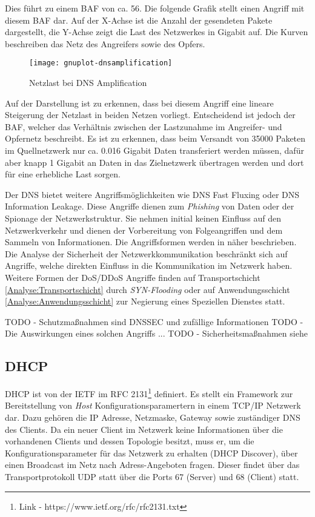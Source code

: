 \clearpage

Dies führt zu einem \ac{BAF} von ca. 56. Die folgende Grafik stellt einen Angriff mit diesem \ac{BAF} dar. Auf der X-Achse ist die Anzahl der gesendeten Pakete dargestellt, die Y-Achse zeigt die Last des Netzwerkes in Gigabit auf. Die Kurven beschreiben das Netz des Angreifers sowie des Opfers.

\begin{figure}[h]
    \centering
    \texttt{[image: gnuplot-dnsamplification]}
    \caption{Netzlast bei DNS Amplification}
    \label{Analyse:Netzlast bei DNS Amplification}
  \end{figure}
  
\clearpage

Auf der Darstellung ist zu erkennen, dass bei diesem Angriff eine lineare Steigerung der Netzlast in beiden Netzen vorliegt. Entscheidend ist jedoch der \ac{BAF}, welcher das Verhältnis zwischen der Lastzunahme im Angreifer- und Opfernetz beschreibt. Es ist zu erkennen, dass beim Versandt von 35000 Paketen im Quellnetzwerk nur ca. 0.016 Gigabit Daten transferiert werden müssen, dafür aber knapp 1 Gigabit an Daten in das Zielnetzwerk übertragen werden und dort für eine erhebliche Last sorgen.

Der \ac{DNS} bietet weitere Angriffsmöglichkeiten wie \ac{DNS} Fast Fluxing oder \ac{DNS} Information Leakage. Diese Angriffe dienen zum \textit{Phishing} von Daten oder der Spionage der Netzwerkstruktur. Sie nehmen initial keinen Einfluss auf den Netzwerkverkehr und dienen der Vorbereitung von Folgeangriffen und dem Sammeln von Informationen. Die Angriffsformen werden in \cite{Ledermueller2009} näher beschrieben. Die Analyse der Sicherheit der Netzwerkkommunikation beschränkt sich auf Angriffe, welche direkten Einfluss in die Kommunikation im Netzwerk haben. Weitere Formen der \ac{DoS}/\ac{DDoS} Angriffe finden auf Transportschicht \autoref{Analyse:Transportschicht} durch \textit{SYN-Flooding} oder auf Anwendungsschicht \autoref{Analyse:Anwendungsschicht} zur Negierung eines Speziellen Dienstes statt.

TODO - Schutzmaßnahmen sind DNSSEC und zufällige Informationen \label{Analyse:DNSSEC}
TODO - Die Auswirkungen eines solchen Angriffs ...
TODO - Sicherheitsmaßnahmen siehe \cite{Ledermueller2009}

\subsection{\ac{DHCP}}
\label{Analyse:DHCP}
\ac{DHCP} ist von der \ac{IETF} im \ac{RFC} 2131\footnote{Link - https://www.ietf.org/rfc/rfc2131.txt} definiert. Es stellt ein Framework zur Bereitstellung von \textit{Host} Konfigurationsparamertern in einem \ac{TCP}/\ac{IP} Netzwerk dar. Dazu gehören die \ac{IP} Adresse, Netzmaske, Gateway sowie zuständiger \ac{DNS} des Clients. Da ein neuer Client im Netzwerk keine Informationen über die vorhandenen Clients und dessen Topologie besitzt, muss er, um die Konfigurationsparameter für das Netzwerk zu erhalten (\ac{DHCP} Discover), über einen Broadcast im Netz nach Adress-Angeboten fragen. Dieser findet über das Transportprotokoll \ac{UDP} statt über die Ports 67 (Server) und 68 (Client) statt.

